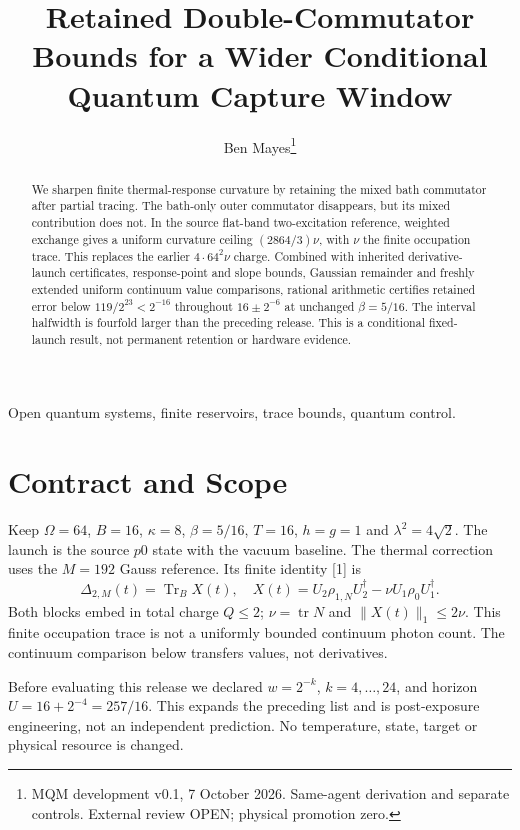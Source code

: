 \documentclass[a4paper,journal]{IEEEtran}
\begin{document}
\title{Retained Double-Commutator Bounds for a Wider Conditional Quantum Capture Window}
\author{Ben Mayes\thanks{MQM development v0.1, 7 October 2026. Same-agent derivation and separate controls. External review OPEN; physical promotion zero.}}
\maketitle
\begin{abstract}
We sharpen finite thermal-response curvature by retaining the mixed bath commutator after partial tracing. The bath-only outer commutator disappears, but its mixed contribution does not. In the source flat-band two-excitation reference, weighted exchange gives a uniform curvature ceiling $(2864/3)\nu$, with $\nu$ the finite occupation trace. This replaces the earlier $4\cdot64^2\nu$ charge. Combined with inherited derivative-launch certificates, response-point and slope bounds, Gaussian remainder and freshly extended uniform continuum value comparisons, rational arithmetic certifies retained error below $119/2^{23}<2^{-16}$ throughout $16\pm2^{-6}$ at unchanged $\beta=5/16$. The interval halfwidth is fourfold larger than the preceding release. This is a conditional fixed-launch result, not permanent retention or hardware evidence.
\end{abstract}
\begin{IEEEkeywords}Open quantum systems, finite reservoirs, trace bounds, quantum control.\end{IEEEkeywords}
\section{Contract and Scope}
Keep $\Omega=64$, $B=16$, $\kappa=8$, $\beta=5/16$, $T=16$, $h=g=1$ and $\lambda^2=4\sqrt2$. The launch is the source $p0$ state with the vacuum baseline. The thermal correction uses the $M=192$ Gauss reference. Its finite identity [1] is
\begin{equation}
 \Delta_{2,M}(t)=\operatorname{Tr}_B X(t),\quad
 X(t)=U_2\rho_{1,N}U_2^\dagger-\nu U_1\rho_0U_1^\dagger.
\end{equation}
Both blocks embed in total charge $Q\le2$; $\nu=\operatorname{tr}N$ and $\|X(t)\|_1\le2\nu$. This finite occupation trace is not a uniformly bounded continuum photon count. The continuum comparison below transfers values, not derivatives.

Before evaluating this release we declared $w=2^{-k}$, $k=4,\ldots,24$, and horizon $U=16+2^{-4}=257/16$. This expands the preceding list and is post-exposure engineering, not an independent prediction. No temperature, state, target or physical resource is changed.
\end{document}
